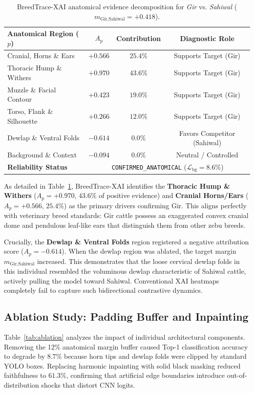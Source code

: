 \documentclass[conference]{IEEEtran}
\begin{document}
\begin{table}[h]
\caption{BreedTrace-XAI anatomical evidence decomposition for \textit{Gir} vs. \textit{Sahiwal} ($m_{\text{Gir,Sahiwal}} = +0.418$).}
\label{tab:case_study_gir}
\centering
\begin{tabular}{lccc}
\toprule
\textbf{Anatomical Region ($p$)} & \textbf{$A_p$} & \textbf{Contribution} & \textbf{Diagnostic Role} \\
\midrule
Cranial, Horns \& Ears & $+0.566$ & $25.4\%$ & Supports Target (Gir) \\
Thoracic Hump \& Withers & $+0.970$ & $43.6\%$ & Supports Target (Gir) \\
Muzzle \& Facial Contour & $+0.423$ & $19.0\%$ & Supports Target (Gir) \\
Torso, Flank \& Silhouette & $+0.266$ & $12.0\%$ & Supports Target (Gir) \\
Dewlap \& Ventral Folds & $-0.614$ & $0.0\%$ & Favors Competitor (Sahiwal) \\
Background \& Context & $-0.094$ & $0.0\%$ & Neutral / Controlled \\
\midrule
\textbf{Reliability Status} & \multicolumn{3}{c}{\texttt{CONFIRMED\_ANATOMICAL} ($\mathcal{L}_{\text{bg}} = 8.6\%$)} \\
\bottomrule
\end{tabular}
\end{table}

As detailed in Table~\ref{tab:case_study_gir}, BreedTrace-XAI identifies the \textbf{Thoracic Hump \& Withers} ($A_p = +0.970$, $43.6\%$ of positive evidence) and \textbf{Cranial Horns/Ears} ($A_p = +0.566$, $25.4\%$) as the primary drivers confirming Gir. This aligns perfectly with veterinary breed standards: Gir cattle possess an exaggerated convex cranial dome and pendulous leaf-like ears that distinguish them from other zebu breeds. 

Crucially, the \textbf{Dewlap \& Ventral Folds} region registered a negative attribution score ($A_p = -0.614$). When the dewlap region was ablated, the target margin $m_{\text{Gir,Sahiwal}}$ increased. This demonstrates that the loose cervical dewlap folds in this individual resembled the voluminous dewlap characteristic of Sahiwal cattle, actively pulling the model toward Sahiwal. Conventional XAI heatmaps completely fail to capture such bidirectional contrastive dynamics.

\subsection{Ablation Study: Padding Buffer and Inpainting}
Table~\ref{tab:ablation} analyzes the impact of individual architectural components. Removing the 12\% anatomical margin buffer caused Top-1 classification accuracy to degrade by $8.7\%$ because horn tips and dewlap folds were clipped by standard YOLO boxes. Replacing harmonic inpainting with solid black masking reduced faithfulness to $61.3\%$, confirming that artificial edge boundaries introduce out-of-distribution shocks that distort CNN logits.
\end{document}
